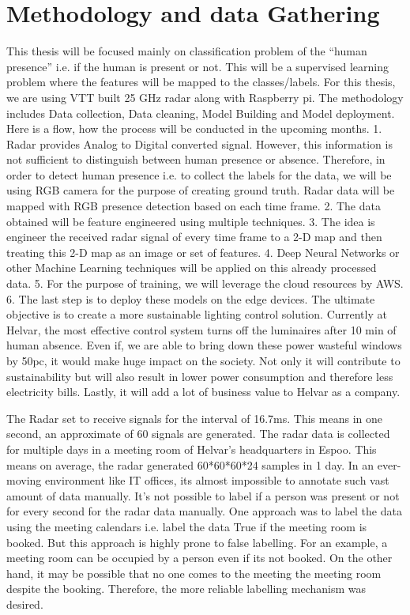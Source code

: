 \chapter{Methodology and data Gathering}
\label{chapter:methodology}
This thesis will be focused mainly on classification problem of the “human presence” i.e. if the human is present or not. This will be a supervised learning problem where the features will be mapped to the classes/labels.
For this thesis, we are using VTT built 25 GHz radar along with Raspberry pi. The methodology includes Data collection, Data cleaning, Model Building and Model deployment. Here is a flow, how the process will be conducted in the upcoming months.
1. Radar provides Analog to Digital converted signal. However, this information is not sufficient to distinguish between human presence or absence. Therefore, in order to detect human presence i.e. to collect the labels for the data, we will be using RGB camera for the purpose of creating ground truth. Radar data will be mapped with RGB presence detection based on each time frame.
2. The data obtained will be feature engineered using multiple techniques.
3. The idea is engineer the received radar signal of every time frame to a 2-D map and then treating this 2-D map as an image or set of features.
4. Deep Neural Networks or other Machine Learning techniques will be applied on this already processed data.
5. For the purpose of training, we will leverage the cloud resources by AWS.
6. The last step is to deploy these models on the edge devices.
The ultimate objective is to create a more sustainable lighting control solution. Currently at Helvar, the most effective control system turns off the luminaires after 10 min of human absence. Even if, we are able to bring down these power wasteful windows by 50pc, it would make huge impact on the society. Not only it will contribute to sustainability but will also result in lower power consumption and therefore less electricity bills. Lastly, it will add a lot of business value to Helvar as a company.





The Radar set to receive signals for the interval of 16.7ms. This means in one second, an approximate of 60 signals are generated. The radar data is collected for multiple days in a meeting room of Helvar’s headquarters in Espoo. This means on average, the radar generated 60*60*60*24 samples in 1 day. In an ever-moving environment like IT offices, its almost impossible to annotate such vast amount of data manually. It’s not possible to label if a person was present or not for every second for the radar data manually.  One approach was to label the data using the meeting calendars i.e. label the data True if the meeting room is booked. But this approach is highly prone to false labelling. For an example, a meeting room can be occupied by a person even if its not booked. On the other hand, it may be possible that no one comes to the meeting the meeting room despite the booking. Therefore, the more reliable labelling mechanism was desired.

